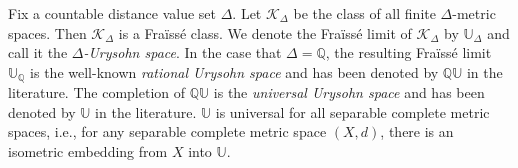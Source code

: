 \documentclass{amsart}
\newtheorem{lemma}[theorem]{Lemma}
\theoremstyle{definition}
\theoremstyle{remark}
\begin{document}

Fix a countable distance value set $\Delta$. Let $\mathcal{K}_\Delta$ be the class of all finite $\Delta$-metric spaces. Then $\mathcal{K}_\Delta$ is a Fra\"iss\'e class. We denote the Fra\"iss\'e limit of $\mathcal{K}_\Delta$ by $\mathbb{U}_{\Delta}$ and call it the {\em $\Delta$-Urysohn space}. In the case that $\Delta = \mathbb{Q}$, the resulting Fra\"iss\'e limit $\mathbb{U}_{\mathbb{Q}}$ is the well-known {\em rational Urysohn space} and has been denoted by $\mathbb{QU}$ in the literature.  The completion of $\mathbb{QU}$ is the {\em universal Urysohn space} and has been denoted by $\mathbb{U}$ in the literature. $\mathbb{U}$ is universal for all separable complete metric spaces, i.e., for any separable complete metric space $(X,d)$, there is an isometric embedding from $X$ into $\mathbb{U}$. 
\end{document}
